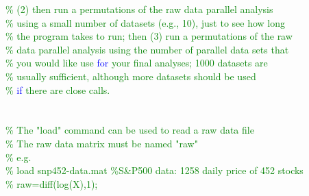 \hspace{1mm}\indent \indent \indent \textcolor{green}{\%  (2) then run a permutations of the raw data parallel analysis }\\ 
\hspace{1mm}\indent \indent \indent \textcolor{green}{\%  using a small number of datasets (e.g., 10), just to see how long }\\ 
\hspace{1mm}\indent \indent \indent \textcolor{green}{\%  the program takes to run; then (3) run a permutations of the raw }\\ 
\hspace{1mm}\indent \indent \indent \textcolor{green}{\%  data parallel analysis using the number of parallel data sets that }\\ 
\hspace{1mm}\indent \indent \indent \textcolor{green}{\%  you would like use \textcolor{blue}{for} your final analyses; 1000 datasets are  }\\ 
\hspace{1mm}\indent \indent \indent \indent \textcolor{green}{\%  usually sufficient, although more datasets should be used }\\ 
\hspace{1mm}\indent \indent \indent \indent \textcolor{green}{\%  \textcolor{blue}{if} there are close calls. }\\ 
\hspace{1mm}\indent \indent \indent \indent \indent  \\ 
\hspace{1mm}\indent \indent \indent \indent \indent  \\ 
\hspace{1mm}\indent \indent \indent \indent \indent \textcolor{green}{\% The "load" command can be used to read a raw data file }\\ 
\hspace{1mm}\indent \indent \indent \indent \indent \textcolor{green}{\% The raw data matrix must be named "raw" }\\ 
\hspace{1mm}\indent \indent \indent \indent \indent \textcolor{green}{\% e.g. }\\ 
\hspace{1mm}\indent \indent \indent \indent \indent \textcolor{green}{\%   load snp452-data.mat  }\textcolor{green}{\%S\&P500 data: 1258 daily price of 452 stocks }\\ 
\hspace{1mm}\indent \indent \indent \indent \indent \textcolor{green}{\%   raw=diff(log(X),1); }\\ 
